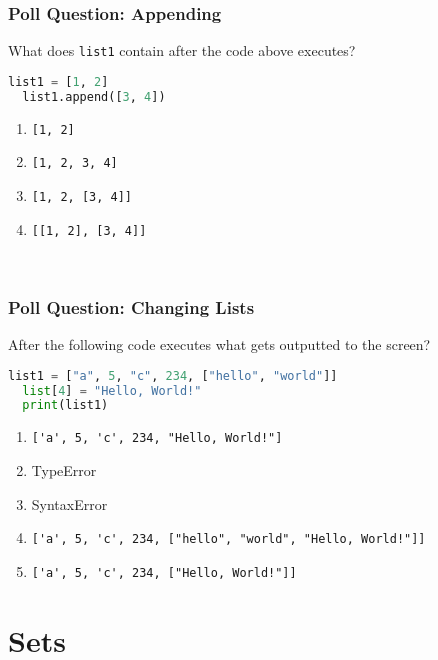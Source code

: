 \documentclass{beamer}
\begin{document}
%
%
\begin{frame}[fragile]
  \frametitle{Poll Question: Appending}
  What does \lstinline|list1| contain after the code above executes?
  \begin{lstlisting}[language=Python, autogobble]
  list1 = [1, 2]
  list1.append([3, 4])
  \end{lstlisting}
  \vfill
  \begin{enumerate}[A] 
    \item \lstinline|[1, 2]|
    \item \lstinline|[1, 2, 3, 4]|
    \item \lstinline|[1, 2, [3, 4]]| %
    \item \lstinline|[[1, 2], [3, 4]]|
  \end{enumerate}
  \
\end{frame}


%
%
\begin{frame}[fragile]
  \frametitle{Poll Question: Changing Lists}
  After the following code executes what gets outputted to the screen?
  \begin{lstlisting}[language=Python, autogobble]
  list1 = ["a", 5, "c", 234, ["hello", "world"]]
  list[4] = "Hello, World!"
  print(list1)
  \end{lstlisting}
  \vfill
  \begin{enumerate}[A] 
    \item \lstinline|['a', 5, 'c', 234, "Hello, World!"]| %
    \item TypeError
    \item SyntaxError
    \item \lstinline|['a', 5, 'c', 234, ["hello", "world", "Hello, World!"]]|
    \item \lstinline|['a', 5, 'c', 234, ["Hello, World!"]]|
  \end{enumerate}
\end{frame}

\section{Sets}
\end{document}
